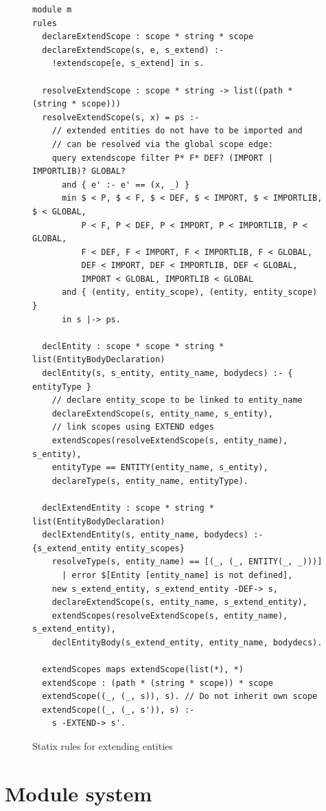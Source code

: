     \begin{figure}
      \begin{verbatim}
module m
rules
  declareExtendScope : scope * string * scope
  declareExtendScope(s, e, s_extend) :-
    !extendscope[e, s_extend] in s.

  resolveExtendScope : scope * string -> list((path * (string * scope)))
  resolveExtendScope(s, x) = ps :-
    // extended entities do not have to be imported and
    // can be resolved via the global scope edge:
    query extendscope filter P* F* DEF? (IMPORT | IMPORTLIB)? GLOBAL?
      and { e' :- e' == (x, _) }
      min $ < P, $ < F, $ < DEF, $ < IMPORT, $ < IMPORTLIB, $ < GLOBAL,
          P < F, P < DEF, P < IMPORT, P < IMPORTLIB, P < GLOBAL,
          F < DEF, F < IMPORT, F < IMPORTLIB, F < GLOBAL,
          DEF < IMPORT, DEF < IMPORTLIB, DEF < GLOBAL,
          IMPORT < GLOBAL, IMPORTLIB < GLOBAL
      and { (entity, entity_scope), (entity, entity_scope) }
      in s |-> ps.

  declEntity : scope * scope * string * list(EntityBodyDeclaration)
  declEntity(s, s_entity, entity_name, bodydecs) :- { entityType }
    // declare entity_scope to be linked to entity_name
    declareExtendScope(s, entity_name, s_entity),
    // link scopes using EXTEND edges
    extendScopes(resolveExtendScope(s, entity_name), s_entity),
    entityType == ENTITY(entity_name, s_entity),
    declareType(s, entity_name, entityType).

  declExtendEntity : scope * string * list(EntityBodyDeclaration)
  declExtendEntity(s, entity_name, bodydecs) :- {s_extend_entity entity_scopes}
    resolveType(s, entity_name) == [(_, (_, ENTITY(_, _)))]
      | error $[Entity [entity_name] is not defined],
    new s_extend_entity, s_extend_entity -DEF-> s,
    declareExtendScope(s, entity_name, s_extend_entity),
    extendScopes(resolveExtendScope(s, entity_name), s_extend_entity),
    declEntityBody(s_extend_entity, entity_name, bodydecs).

  extendScopes maps extendScope(list(*), *)
  extendScope : (path * (string * scope)) * scope
  extendScope((_, (_, s)), s). // Do not inherit own scope
  extendScope((_, (_, s')), s) :-
    s -EXTEND-> s'.
      \end{verbatim}
      \caption{\label{fig:extend-entity-statix}Statix rules for extending entities}
    \end{figure}

  \section{\label{sec:module-system}Module system}

